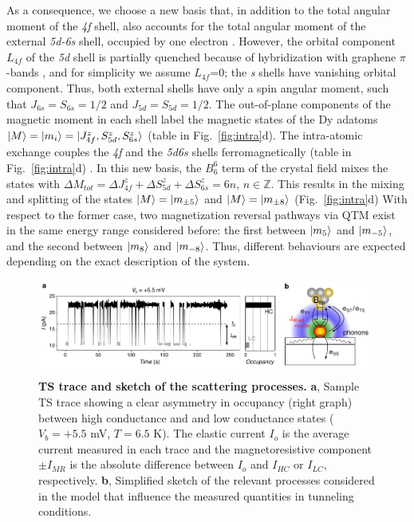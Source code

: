\documentclass[
reprint,amsmath,amssymb,aps]{revtex4-2}
\begin{document}
As a consequence, we choose a new basis that, in addition to the total angular moment of the \textit{4f} shell, also accounts for the total angular moment of the external \textit{5d-6s} shell, occupied by one electron \cite{pivettaMeasuringIntraAtomicExchange2020,pivettaMeasuringIntraAtomicExchange2020}. However, the orbital component  $L_{4f}$ of the \textit{5d} shell is partially quenched because of hybridization with graphene $\pi$-bands \cite{donati2014}, and for simplicity we assume $L_{4f}$=0; the \textit{s} shells have vanishing orbital component. Thus, both external shells have only a spin angular moment, such that $J_{6s}=S_{6s}=1/2$ and $J_{5d}=S_{5d}=1/2$. The out-of-plane components of the magnetic moment in each shell label the magnetic states of the Dy adatoms $\ket{M}=\ket{m_i}=\ket{J_{4f}^z,S_{5d}^z,S_{6s}^z}$ (table in Fig.~\ref{fig:intra}d).
The intra-atomic exchange couples the \textit{4f} and the \textit{5d6s} shells ferromagnetically (table in Fig.~\ref{fig:intra}d) \cite{pivettaMeasuringIntraAtomicExchange2020}. 
In this new basis, the $B_6^6$ term of the crystal field mixes the states with $\Delta M_{tot}=\Delta J_{4f}^z + \Delta S_{5d}^z + \Delta S_{6s}^z=6n$, $n\in \mathbb{Z}$. This results in the mixing and splitting of the states $\ket{M}=\ket{m_{\pm 5}}$ and $\ket{M}=\ket{m_{\pm 8}}$ (Fig.~\ref{fig:intra}d)
With respect to the former case, two magnetization reversal pathways via QTM exist in the same energy range considered before: the first between $\ket{m_{5}}$ and $\ket{m_{-5}}$, and the second between $\ket{m_{8}}$ and $\ket{m_{-8}}$. Thus, different behaviours are expected depending on the exact description of the system. 

\begin{figure}[ht!]
\includegraphics[width=0.98\textwidth]{Fig2_new.pdf}
\caption{\textbf{TS trace and sketch of the scattering processes.} \textbf{a},  Sample TS trace showing a clear asymmetry in occupancy (right graph) between high conductance and and low conductance states ($V_{b} = +5.5$ mV, $T = 6.5$ K). The elastic current $I_{o}$ is the average current measured in each trace and the magnetoresistive component $\pm I_{MR}$ is the absolute difference between $I_{o}$ and $I_{HC}$ or $I_{LC}$, respectively. \textbf{b}, Simplified sketch of the relevant processes considered in the model that influence the measured quantities in tunneling conditions.
\label{fig:no_tip_tip_telegraph} }
\end{figure}
\end{document}
